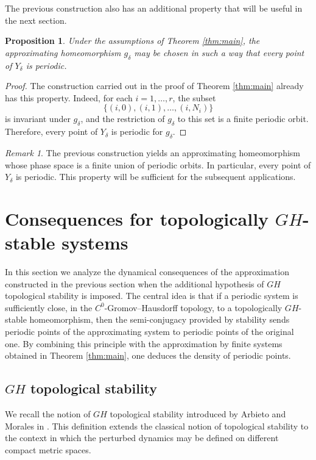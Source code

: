 \documentclass{amsart}
\numberwithin{equation}{section}
\newtheorem{proposition}[theorem]{Proposition}
\theoremstyle{remark}
\newtheorem{remark}[theorem]{Remark}
\begin{document}
The previous construction also has an additional property that will be useful in the next section.

\begin{proposition}\label{prop:periodic_version}
Under the assumptions of Theorem \ref{thm:main}, the approximating homeomorphism $g_\delta$ may be chosen in such a way that every point of $Y_\delta$ is periodic.
\end{proposition}

\begin{proof}
The construction carried out in the proof of Theorem \ref{thm:main} already has this property. Indeed, for each $i=1,\dots,r$, the subset
\[
\{(i,0),(i,1),\dots,(i,N_i)\}
\]
is invariant under $g_\delta$, and the restriction of $g_\delta$ to this set is a finite periodic orbit. Therefore, every point of $Y_\delta$ is periodic for $g_\delta$.
\end{proof}

\begin{remark}\label{rem:single_cycle}
The previous construction yields an approximating homeomorphism whose phase space is a finite union of periodic orbits. In particular, every point of $Y_\delta$ is periodic. This property will be sufficient for the subsequent applications.
\end{remark}

\section{Consequences for topologically $GH$-stable systems}

In this section we analyze the dynamical consequences of the approximation constructed in the previous section when the additional hypothesis of $GH$ topological stability is imposed. The central idea is that if a periodic system is sufficiently close, in the $C^0$-Gromov--Hausdorff topology, to a topologically $GH$-stable homeomorphism, then the semi-conjugacy provided by stability sends periodic points of the approximating system to periodic points of the original one. By combining this principle with the approximation by finite systems obtained in Theorem \ref{thm:main}, one deduces the density of periodic points.

\subsection{$GH$ topological stability}

We recall the notion of $GH$ topological stability introduced by Arbieto and Morales in \cite{arbieto2017topological}. This definition extends the classical notion of topological stability to the context in which the perturbed dynamics may be defined on different compact metric spaces.
\end{document}
